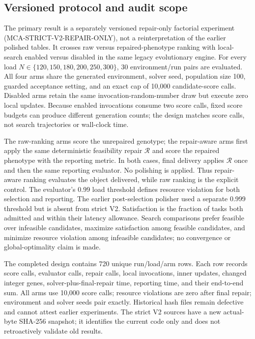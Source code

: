 \documentclass[pdflatex,sn-mathphys-num]{sn-jnl}
\begin{document}
\subsection{Versioned protocol and audit scope}
The primary result is a separately versioned repair-only factorial experiment (MCA-STRICT-V2-REPAIR-ONLY), not a reinterpretation of the earlier polished tables. It crosses raw versus repaired-phenotype ranking with local-search enabled versus disabled in the same legacy evolutionary engine. For every load $N\in\{120,150,180,200,250,300\}$, 30 environment/run pairs are evaluated. All four arms share the generated environment, solver seed, population size 100, guarded acceptance setting, and an exact cap of 10,000 candidate-score calls. Disabled arms retain the same invocation-random-number draw but execute zero local updates. Because enabled invocations consume two score calls, fixed score budgets can produce different generation counts; the design matches score calls, not search trajectories or wall-clock time.

The raw-ranking arms score the unrepaired genotype; the repair-aware arms first apply the same deterministic feasibility repair $\mathcal{R}$ and score the repaired phenotype with the reporting metric. In both cases, final delivery applies $\mathcal{R}$ once and then the same reporting evaluator. No polishing is applied. Thus repair-aware ranking evaluates the object delivered, while raw ranking is the explicit control. The evaluator's 0.99 load threshold defines resource violation for both selection and reporting. The earlier post-selection polisher used a separate 0.999 threshold but is absent from strict V2. Satisfaction is the fraction of tasks both admitted and within their latency allowance. Search comparisons prefer feasible over infeasible candidates, maximize satisfaction among feasible candidates, and minimize resource violation among infeasible candidates; no convergence or global-optimality claim is made.

The completed design contains 720 unique run/load/arm rows. Each row records score calls, evaluator calls, repair calls, local invocations, inner updates, changed integer genes, solver-plus-final-repair time, reporting time, and their end-to-end sum. All arms use 10,000 score calls; resource violations are zero after final repair; environment and solver seeds pair exactly. Historical hash files remain defective and cannot attest earlier experiments. The strict V2 sources have a new actual-byte SHA-256 snapshot; it identifies the current code only and does not retroactively validate old results.
\end{document}
